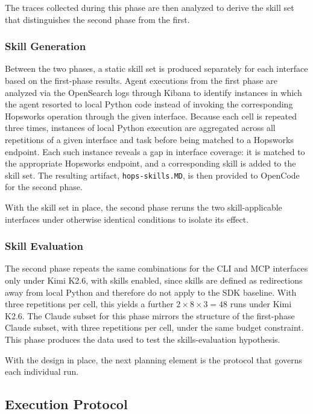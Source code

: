 \documentclass[
english,                 %
bibtex,                  %
includeExtraAbstracts, %
]{kththesis}
\numberwithin{listing}{chapter}
\begin{document}
The traces collected during this phase are then analyzed to derive the skill set that distinguishes the second phase from the first.

\subsubsection{Skill Generation}

Between the two phases, a static skill set is produced separately for each interface based on the first-phase results. Agent executions from the first phase are analyzed via the OpenSearch logs through Kibana to identify instances in which the agent resorted to local Python code instead of invoking the corresponding Hopsworks operation through the given interface. Because each cell is repeated three times, instances of local Python execution are aggregated across all repetitions of a given interface and task before being matched to a Hopsworks endpoint. Each such instance reveals a gap in interface coverage: it is matched to the appropriate Hopsworks endpoint, and a corresponding skill is added to the skill set. The resulting artifact, \texttt{hops-skills.\gls{MD}}, is then provided to OpenCode for the second phase.

With the skill set in place, the second phase reruns the two skill-applicable interfaces under otherwise identical conditions to isolate its effect.

\subsubsection{Skill Evaluation}

The second phase repeats the same combinations for the \gls{CLI} and \gls{MCP} interfaces only under Kimi K2.6, with skills enabled, since skills are defined as redirections away from local Python and therefore do not apply to the \gls{SDK} baseline. With three repetitions per cell, this yields a further $2 \times 8 \times 3 = 48$ runs under Kimi K2.6. The Claude subset for this phase mirrors the structure of the first-phase Claude subset, with three repetitions per cell, under the same budget constraint. This phase produces the data used to test the skills-evaluation hypothesis.

With the design in place, the next planning element is the protocol that governs each individual run.

\subsection{Execution Protocol}
\end{document}
